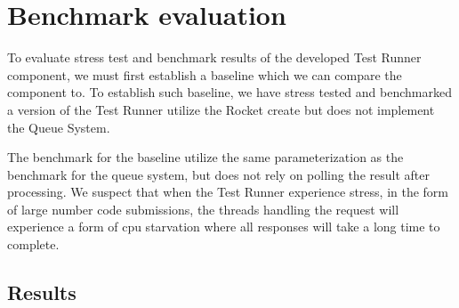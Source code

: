 \section{Benchmark evaluation}
To evaluate stress test and benchmark results of the developed Test Runner component, we must first establish a baseline which we can compare the component to. 
To establish such baseline, we have stress tested and benchmarked a version of the Test Runner utilize the Rocket create but does not implement the Queue System. 

The benchmark for the baseline utilize the same parameterization as the benchmark for the queue system, but does not rely on polling the result after processing. 
We suspect that when the Test Runner experience stress, in the form of large number code submissions, the threads handling the request will experience a form of cpu starvation where all responses will take a long time to complete.


\subsection{Results}
